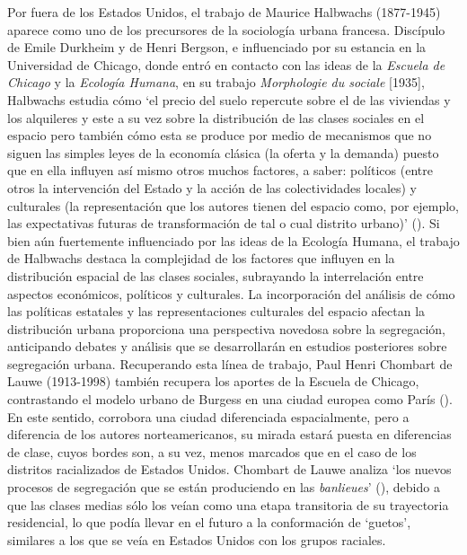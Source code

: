 \documentclass[
  spanish,
  a4paper,%
  chapterprefix=true,%
  DIV=calc,%
  twoside]{scrbook}%
\begin{document}
Por fuera de los Estados Unidos,
el trabajo de
Maurice Halbwachs (1877-1945) aparece como uno de los precursores de la
sociología urbana francesa. Discípulo de Emile Durkheim y de Henri
Bergson, e influenciado por su estancia en la Universidad de Chicago,
donde entró en contacto con las ideas de la \emph{Escuela de Chicago} y la
\emph{Ecología Humana}, en su trabajo \emph{Morphologie du sociale} {[}1935{]},
Halbwachs estudia cómo `el precio del suelo repercute sobre el de las
viviendas y los alquileres y este a su vez sobre la distribución de las
clases sociales en el espacio pero también cómo esta se produce por
medio de mecanismos que no siguen las simples leyes de la economía
clásica (la oferta y la demanda) puesto que en ella influyen así mismo
otros muchos factores, a saber: políticos (entre otros la intervención
del Estado y la acción de las colectividades locales) y culturales (la
representación que los autores tienen del espacio como, por ejemplo, las
expectativas futuras de transformación de tal o cual distrito urbano)'
(). Si bien aún fuertemente influenciado por
las ideas de la Ecología Humana, el trabajo de Halbwachs destaca la
complejidad de los factores que influyen en la distribución espacial de
las clases sociales, subrayando la interrelación entre aspectos
económicos, políticos y culturales. La incorporación del análisis de
cómo las políticas estatales y las representaciones culturales del
espacio afectan la distribución urbana proporciona una perspectiva
novedosa sobre la segregación, anticipando debates y análisis que se
desarrollarán en estudios posteriores sobre segregación urbana.
Recuperando
esta línea de trabajo, Paul Henri Chombart de Lauwe (1913-1998) también
recupera los aportes de la Escuela de Chicago, contrastando el modelo
urbano de Burgess en una ciudad europea como París (). En este sentido, corrobora una ciudad diferenciada
espacialmente, pero a diferencia de los autores norteamericanos, su
mirada estará puesta en diferencias de clase, cuyos bordes son, a su
vez, menos marcados que en el caso de los distritos racializados de
Estados Unidos. Chombart de Lauwe analiza `los nuevos procesos de
segregación que se están produciendo en las \emph{banlieues}'
(), debido a que las clases medias sólo los
veían como una etapa transitoria de su trayectoria residencial, lo que
podía llevar en el futuro a la conformación de `guetos', similares a los
que se veía en Estados Unidos con los grupos raciales.
\end{document}
